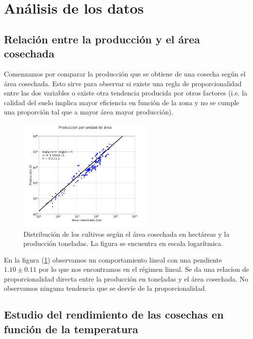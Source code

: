 \documentclass[12pt, spanish]{article}
\begin{document}
\section{Análisis de los datos}





\subsection{Relación entre la producción y el área cosechada}

Comenzamos por comparar la producción que se obtiene de una cosecha según el área cosechada. Esto sirve para observar si existe una regla de proporcionalidad entre las dos variables o existe otra tendencia producida por otros factores (i.e. la calidad del suelo implica mayor eficiencia en función de la zona y no se cumple una proporción tal que a mayor área mayor producción).

\begin{figure}[H]
    \centering
	\includegraphics[width=0.6\textwidth]{cosecha.png} %
	\caption{Distribución de los cultivos según el área cosechada en hectáreas y la producción toneladas. La figura se encuentra en escala logarítmica.}
	\label{fig:cosecha}
\end{figure}

En la figura (\ref{fig:cosecha}) observamos un comportamiento lineal con una pendiente $1.10 \pm 0.11$ por lo que nos encontramos en el régimen lineal. Se da una relacion de proporcionalidad directa entre la producción en toneladas y el área cosechada. No observamos ninguna tendencia que se desvíe de la proporcionalidad.

\subsection{Estudio del rendimiento de las cosechas en función de la temperatura}
\end{document}
